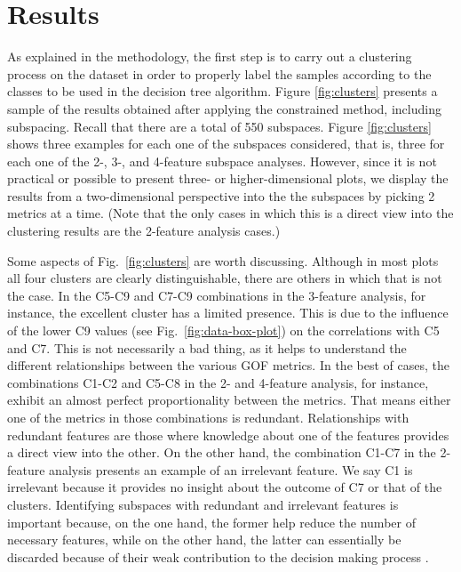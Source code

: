 
\section{Results}
\label{sec:results}

As explained in the methodology, the first step is to carry out a clustering process on the dataset in order to properly label the samples according to the classes to be used in the decision tree algorithm. Figure \ref{fig:clusters} presents a sample of the results obtained after applying the constrained \kmeans{} method, including subspacing. Recall that there are a total of 550 subspaces. Figure \ref{fig:clusters} shows three examples for each one of the subspaces considered, that is, three for each one of the 2-, 3-, and 4-feature subspace analyses. However, since it is not practical or possible to present three- or higher-dimensional plots, we display the results from a two-dimensional perspective into the the subspaces by picking 2 metrics at a time. (Note that the only cases in which this is a direct view into the clustering results are the 2-feature analysis cases.)

Some aspects of Fig.~\ref{fig:clusters} are worth discussing. Although in most plots all four clusters are clearly distinguishable, there are others in which that is not the case. In the C5-C9 and C7-C9 combinations in the 3-feature analysis, for instance, the excellent cluster has a limited presence. This is due to the influence of the lower C9 values (see Fig.~\ref{fig:data-box-plot}) on the correlations with C5 and C7. This is not necessarily a bad thing, as it helps to understand the different relationships between the various GOF metrics. In the best of cases, the combinations C1-C2 and C5-C8 in the 2- and 4-feature analysis, for instance, exhibit an almost perfect proportionality between the metrics. That means either one of the metrics in those combinations is redundant. Relationships with redundant features are those where knowledge about one of the features provides a direct view into the other. On the other hand, the combination C1-C7 in the 2-feature analysis presents an example of an irrelevant feature. We say C1 is irrelevant because it provides no insight about the outcome of C7 or that of the clusters. Identifying subspaces with redundant and irrelevant features is important because, on the one hand, the former help reduce the number of necessary features, while on the other hand, the latter can essentially be discarded because of their weak contribution to the decision making process \citep{Dy_2004_MLR}.

